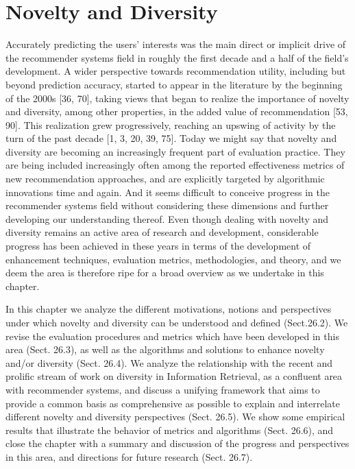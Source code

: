 
\section{Novelty and Diversity}\label{section:novelty_and_diversity}

Accurately predicting the users’ interests was the main direct or implicit drive of the recommender systems field in roughly the first decade and a half of the field’s development. A wider perspective towards recommendation utility, including but beyond prediction accuracy, started to appear in the literature by the beginning of the 2000s [36, 70], taking views that began to realize the importance of novelty and diversity, among other properties, in the added value of recommendation [53, 90]. This realization grew progressively, reaching an upswing of activity by the turn of the past decade [1, 3, 20, 39, 75]. Today we might say that novelty and diversity are becoming an increasingly frequent part of evaluation practice. They are being included increasingly often among the reported effectiveness metrics of new recommendation approaches, and are explicitly targeted by algorithmic innovations time and again. And it seems difficult to conceive progress in the recommender systems field without considering these dimensions and further developing our understanding thereof. Even though dealing with novelty and diversity remains an active area of research and development, considerable progress has been achieved in these years in terms of the development of enhancement techniques, evaluation metrics, methodologies, and theory, and we deem the area is therefore ripe for a broad overview as we undertake in this chapter.

In this chapter we analyze the different motivations, notions and perspectives under which novelty and diversity can be understood and defined (Sect.26.2). We revise the evaluation procedures and metrics which have been developed in this area (Sect. 26.3), as well as the algorithms and solutions to enhance novelty and/or diversity (Sect. 26.4). We analyze the relationship with the recent and prolific stream of work on diversity in Information Retrieval, as a confluent area with recommender systems, and discuss a unifying framework that aims to provide a common basis as comprehensive as possible to explain and interrelate different novelty and diversity perspectives (Sect. 26.5). We show some empirical results that illustrate the behavior of metrics and algorithms (Sect. 26.6), and close the chapter with a summary and discussion of the progress and perspectives in this area, and directions for future research (Sect. 26.7).

